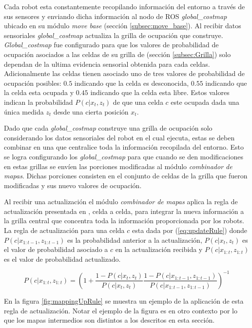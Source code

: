 Cada robot esta constantemente recopilando información del entorno a través de
sus sensores y enviando dicha información al nodo de \gls{ROS} \emph{global\_costmap}
ubicado en su módulo \emph{move base} (sección \ref{subsec:move_base}). Al
recibir datos sensoriales \emph{global\_costmap} actualiza la grilla de
ocupación que construye. \emph{Global\_costmap} fue configurado para que los
valores de probabilidad de ocupación asociados a las celdas de su grilla de
(sección \ref{subsec:Grilla}) solo dependan de la ultima evidencia sensorial
obtenida para cada celdas. Adicionalmente las celdas tienen asociado uno de
tres valores de probabilidad de ocupación posibles: $0.5$ indicando que la
celda es desconocida, $0.55$ indicando que la celda esta ocupada y $0.45$
indicando que la celda esta libre. Estos valores indican la probabilidad
$P(c|x_t,z_t)$ de que una celda $c$ este ocupada dada una única medida $z_t$
desde una cierta posición $x_t$.

Dado que cada \emph{global\_costmap} construye una grilla de ocupación solo
considerando los datos sensoriales del robot en el cual ejecuta, estas se deben
combinar en una que centralice toda la información recopilada del entorno. Esto
se logra configurando los \emph{global\_costmap} para que cuando se den
modificaciones en estas grillas se envíen las porciones modificadas al módulo
\emph{combinador de mapas}. Dichas porciones consisten en el conjunto de celdas
de la grilla que fueron modificadas y sus nuevo valores de ocupación.

Al recibir una actualización el módulo \emph{combinador de mapas} aplica la
regla de actualización presentada en \cite{stachniss2009robotic}, celda a
celda, para integrar la nueva información a la grilla central que concentra
toda la información proporcionada por los robots. La regla de actualización
para una celda $c$ esta dada
por (\ref{eq:updateRule}) donde $P(c|x_{1:t-1},z_{1:t-1})$ es la probabilidad
anterior a la actualización, $P(c | x_t,z_t)$ es el valor de probabilidad
asociado a $c$ en la actualización recibida y  $P(c|x_{1:t},z_{1:t})$ es el
valor de probabilidad actualizado. 

\begin{equation}
  P(c|x_{1:t},z_{1:t}) =\left( 1 + \frac{1 - P(c | x_t,z_t)}{P(c|x_t,z_t)} \frac{1 - P(c|x_{1:t-1},z_{1:t-1})}{P(c|x_{1:t-1},z_{1:t-1})} \right)^{-1}
\label{eq:updateRule}
\end{equation}

En la figura \ref{fig:mappingUpRule} se muestra un ejemplo de la aplicación de
esta regla de actualización. Notar el ejemplo de la figura es en otro contexto
por lo que los mapas intermedios son distintos a los descritos en esta sección.

